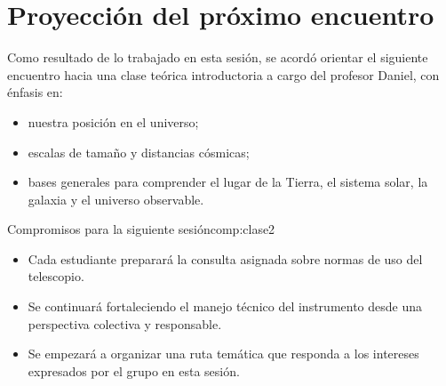 \section{Proyección del próximo encuentro}

Como resultado de lo trabajado en esta sesión, se acordó orientar el siguiente
encuentro hacia una clase teórica introductoria a cargo del profesor Daniel, con énfasis en:

\begin{itemize}[leftmargin=1.5em]
    \item nuestra posición en el universo;
    \item escalas de tamaño y distancias cósmicas;
    \item bases generales para comprender el lugar de la Tierra, el sistema solar,
          la galaxia y el universo observable.
\end{itemize}

\begin{compromiso}{Compromisos para la siguiente sesión}{comp:clase2}
    \begin{itemize}[leftmargin=1.5em]
        \item Cada estudiante preparará la consulta asignada sobre normas de uso del
              telescopio.
        \item Se continuará fortaleciendo el manejo técnico del instrumento desde una
              perspectiva colectiva y responsable.
        \item Se empezará a organizar una ruta temática que responda a los intereses
              expresados por el grupo en esta sesión.
    \end{itemize}
\end{compromiso}